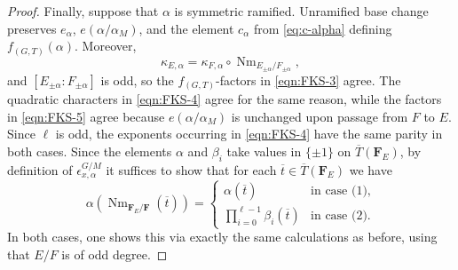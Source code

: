 \documentclass[reqno]{amsart}
\numberwithin{equation}{subsection}
\newcommand{\F}{\mathbf{F}}
\newcommand{\Gal}{\operatorname{Gal}}
\newcommand{\ol}[1]{\overline{#1}}
\DeclareMathOperator{\Nm}{Nm}
\theoremstyle{remark}
\numberwithin{equation}{subsection}
\numberwithin{figure}{subsection}
\begin{document}
\begin{proof}
Finally, suppose that $\alpha$ is symmetric ramified. Unramified base change preserves $e_\alpha$, $e(\alpha/\alpha_M)$, and the element $c_\alpha$ from \eqref{eq:c-alpha} defining $f_{(G,T)}(\alpha)$. Moreover,
\[
    \kappa_{E,\alpha}
    =\kappa_{F,\alpha}\circ \Nm_{E_{\pm\alpha}/F_{\pm\alpha}},
\]
and $[E_{\pm\alpha}:F_{\pm\alpha}]$ is odd, so the $f_{(G,T)}$-factors in \eqref{eqn:FKS-3} agree. The quadratic characters in \eqref{eqn:FKS-4} agree for the same reason, while the factors in \eqref{eqn:FKS-5} agree because $e(\alpha/\alpha_M)$ is unchanged upon passage from $F$ to $E$.
Since $\ell$ is odd, the exponents occurring in \eqref{eqn:FKS-4} have the same parity in both cases. Since the elements $\alpha$ and $\beta_i$ take values in $\{\pm 1\}$ on $\ol T(\F_E)$, by definition of $\epsilon_{x,\alpha}^{G/M}$ it suffices to show that for each $\ol t \in \ol T(\F_E)$ we have
\[
\alpha(\Nm_{\F_E/\F}(\ol t)) = \begin{cases}
    \alpha(\ol t) &\text{in case (1),} \\
    \prod_{i=0}^{\ell-1} \beta_i(\ol t) &\text{in case (2).}
\end{cases}
\]
In both cases, one shows this via exactly the same calculations as before, using that $E/F$ is of odd degree.
\end{proof}
\end{document}
